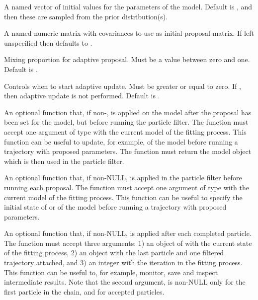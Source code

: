 \documentclass[letterpaper]{book}
\begin{document}
\begin{Arguments}
\begin{ldescription}
\item[\code{theta}] A named vector of initial values for the parameters
of the model.  Default is , and then these are
sampled from the prior distribution(s).

\item[\code{covmat}] A named numeric  matrix with
covariances to use as initial proposal matrix. If left
unspecified then defaults to .

\item[\code{adaptmix}] Mixing proportion for adaptive proposal.  Must be
a value between zero and one. Default is .

\item[\code{adaptive}] Controls when to start adaptive update. Must be
greater or equal to zero. If , then adaptive
update is not performed. Default is .

\item[\code{post\_proposal}] An optional function that, if
non-, is applied on the model after the proposal
has been set for the model, but before running the particle
filter. The function must accept one argument of type
 with the current model of the fitting
process. This function can be useful to update, for example,
 of the model before running a trajectory with
proposed parameters. The function must return the model object
which is then used in the particle filter.

\item[\code{init\_model}] An optional function that, if non-NULL, is
applied in the particle filter before running each
proposal. The function must accept one argument of type
 with the current model of the fitting
process. This function can be useful to specify the initial
state of  or  of the model before running a
trajectory with proposed parameters.

\item[\code{post\_particle}] An optional function that, if non-NULL, is
applied after each completed particle. The function must
accept three arguments: 1) an object of 
with the current state of the fitting process, 2) an object
 with the last particle and one filtered
trajectory attached, and 3) an integer with the iteration in
the fitting process. This function can be useful to, for
example, monitor, save and inspect intermediate results. Note
that the second  argument, is non-NULL
only for the first particle in the chain, and for accepted
particles.


\end{ldescription}
\end{Arguments}
\end{document}
